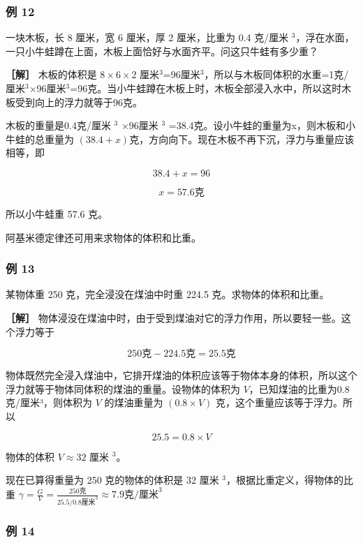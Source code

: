 \subsubsection{例 12}\label{ux4f8b-12}

一块木板，长 8 厘米，宽 6 厘米，厚 2 厘米，比重为 0.4 克/厘米
\(^{3}\)，浮在水面，一只小牛蛙蹲在上面，木板上面恰好与水面齐平。问这只牛蛙有多少重？

\textbf{［解］} 木板的体积是 \(8 \times 6 \times 2\)
厘米\(^{3}\)=96厘米\(^{3}\)，所以与木板同体积的水重=1克/厘米\(^{3}\)×96厘米\(^{3}\)=96克。当小牛蛙蹲在木板上时，木板全部浸入水中，所以这时木板受到向上的浮力就等于96克。

木板的重量是0.4克/厘米 \(^{3}\) ×96厘米 \(^{3}\)
=38.4克。设小牛蛙的重量为x，则木板和小牛蛙的总重量为
\((38.4+x)\)克，方向向下。现在木板不再下沉，浮力与重量应该相等，即

\[
38.4 + x = 96
\]

\[
x = 57.6 \text{克}
\]

所以小牛蛙重 57.6 克。

阿基米德定律还可用来求物体的体积和比重。

\subsubsection{例 13}\label{ux4f8b-13}

某物体重 250 克，完全浸没在煤油中时重 224.5 克。求物体的体积和比重。

\textbf{［解］}
物体浸没在煤油中时，由于受到煤油对它的浮力作用，所以要轻一些。这个浮力等于

\[
250 \text{克} - 224.5 \text{克} = 25.5 \text{克}
\]

物体既然完全浸入煤油中，它排开煤油的体积应该等于物体本身的体积，所以这个浮力就等于物体同体积的煤油的重量。设物体的体积为
\(V\)，已知煤油的比重为0.8克/厘米³，则体积为 \(V\) 的煤油重量为
\((0.8 \times V)\) 克，这个重量应该等于浮力。所以

\[
25.5 = 0.8 \times V
\]

物体的体积 \(V \approx 32\) 厘米 \(^{3}\)。

现在已算得重量为 250 克的物体的体积是 32 厘米
\(^{3}\)，根据比重定义，得物体的比重
\(\gamma = \frac{G}{V} = \frac{250\text{克}}{25.5 / 0.8\text{厘米}^3} \approx 7.9\text{克/厘米}^3\)

\subsubsection{例 14}\label{ux4f8b-14}

